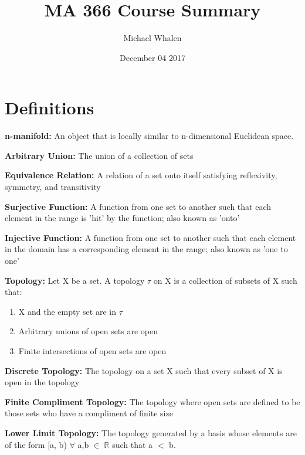 \documentclass[letterpaper,12pt]{article}
\begin{document}
\title{MA 366 Course Summary}
\author{Michael Whalen}
\date{December 04 2017}
\maketitle

\setlength{\parindent}{0pt}


\section*{Definitions}

	\textbf{n-manifold:}
		An object that is locally similar to n-dimensional Euclidean space.
	\newline{}

	\textbf{Arbitrary Union:}
		The union of a collection of sets
	\newline{}

	\textbf{Equivalence Relation:}
		A relation of a set onto itself satisfying reflexivity, symmetry, and transitivity
	\newline{}

	\textbf{Surjective Function:}
		A function from one set to another such that each element in the range is 'hit' by the function; also known as 'onto'
	\newline{}

	\textbf{Injective Function:}
		A function from one set to another such that each element in the domain has a corresponding element in the range; also known as 'one to one'
	\newline{}

	\textbf{Topology:}
		Let X be a set. A topology $\tau$ on X is a collection of subsets of X such that:
		\begin{enumerate}
			\item X and the empty set are in $\tau$
			\item Arbitrary unions of open sets are open
			\item Finite intersections of open sets are open
		\end{enumerate}

	\textbf{Discrete Topology:}
		The topology on a set X such that every subset of X is open in the topology
	\newline{}

	\textbf{Finite Compliment Topology:}
		The topology where open sets are defined to be those sets who have a compliment of finite size
	\newline{}

	\textbf{Lower Limit Topology:}
		The topology generated by a basis whose elements are of the form [a, b) $\forall$ a,b $\in$ $\mathbb{R}$ such that a $<$ b. 
	\newline{}
\end{document}
